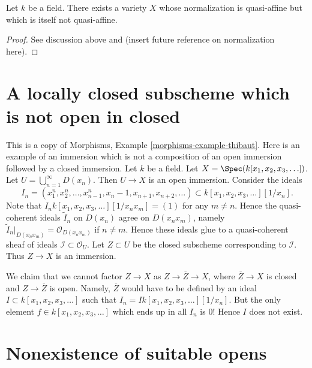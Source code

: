 \begin{lemma}
\label{lemma-quasi-affine-normalization-not-quasi-affine}
Let $k$ be a field.
There exists a variety $X$ whose normalization is quasi-affine but
which is itself not quasi-affine.
\end{lemma}

\begin{proof}
See discussion above and (insert future reference on normalization here).
\end{proof}






\section{A locally closed subscheme which is not open in closed}
\label{section-strange-immersion}

\noindent
This is a copy of
Morphisms, Example \ref{morphisms-example-thibaut}.
Here is an example of an immersion which is not a composition of an
open immersion followed by a closed immersion.
Let $k$ be a field.
Let $X = \Spec(k[x_1, x_2, x_3, \ldots])$.
Let $U = \bigcup_{n = 1}^{\infty} D(x_n)$.
Then $U \to X$ is an open immersion.
Consider the ideals
$$
I_n =
(x_1^n, x_2^n, \ldots, x_{n - 1}^n, x_n - 1, x_{n + 1}, x_{n + 2}, \ldots)
\subset
k[x_1, x_2, x_3, \ldots][1/x_n].
$$
Note that $I_n k[x_1, x_2, x_3, \ldots][1/x_nx_m] = (1)$
for any $m \not = n$. Hence the quasi-coherent ideals
$\widetilde I_n$ on $D(x_n)$ agree on $D(x_nx_m)$, namely
$\widetilde I_n|_{D(x_nx_m)} = \mathcal{O}_{D(x_n x_m)}$ if
$n \not = m$. Hence these ideals glue to a quasi-coherent sheaf of ideals
$\mathcal{I} \subset \mathcal{O}_U$.
Let $Z \subset U$ be the closed subscheme corresponding to
$\mathcal{I}$. Thus $Z \to X$ is an immersion.

\medskip\noindent
We claim that we cannot factor $Z \to X$ as
$Z \to \overline{Z} \to X$, where $\overline{Z} \to X$ is closed
and $Z \to \overline{Z}$ is open. Namely, $\overline{Z}$ would
have to be defined by an ideal $I \subset k[x_1, x_2, x_3, \ldots]$
such that $I_n = I k[x_1, x_2, x_3, \ldots][1/x_n]$.
But the only element $f \in k[x_1, x_2, x_3, \ldots]$
which ends up in all $I_n$ is $0$! Hence $I$ does not exist.




\section{Nonexistence of suitable opens}
\label{section-nonexistence-opens}

